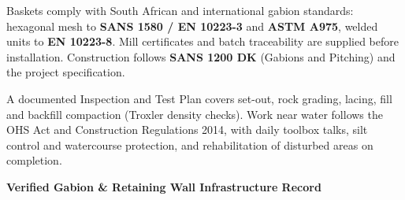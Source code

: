 \documentclass[a4paper,11pt]{article}
\providecommand{\faShieldAlt}{\faShield*}
\begin{document}
\vfill

\noindent
\begin{minipage}[t]{0.485\textwidth}
    \begin{tcolorbox}[
        enhanced, colback=white, colframe=mhlightgray, boxrule=0.8pt, arc=4pt,
        title={\bfseries\color{white}\faShieldAlt\ Materials \& Standards},
        colbacktitle=mhnavy, fonttitle=\bfseries\small,
        left=8pt, right=8pt, top=6pt, bottom=6pt, height=2.8cm,
        drop shadow=black!4
    ]
        {\fontsize{8.0pt}{11.2pt}\selectfont\color{mhtext}
        Baskets comply with South African and international gabion standards: hexagonal mesh to \textbf{SANS 1580 / EN 10223-3} and \textbf{ASTM A975}, welded units to \textbf{EN 10223-8}. Mill certificates and batch traceability are supplied before installation. Construction follows \textbf{SANS 1200 DK} (Gabions and Pitching) and the project specification.
        }
    \end{tcolorbox}
\end{minipage}
\hfill
\begin{minipage}[t]{0.485\textwidth}
    \begin{tcolorbox}[
        enhanced, colback=white, colframe=mhlightgray, boxrule=0.8pt, arc=4pt,
        title={\bfseries\color{white}\faCheckDouble\ Quality, Safety \& Environment},
        colbacktitle=mhblue, fonttitle=\bfseries\small,
        left=8pt, right=8pt, top=6pt, bottom=6pt, height=2.8cm,
        drop shadow=black!4
    ]
        {\fontsize{8.0pt}{11.2pt}\selectfont\color{mhtext}
        A documented Inspection and Test Plan covers set-out, rock grading, lacing, fill and backfill compaction (Troxler density checks). Work near water follows the OHS Act and Construction Regulations 2014, with daily toolbox talks, silt control and watercourse protection, and rehabilitation of disturbed areas on completion.
        }
    \end{tcolorbox}
\end{minipage}

\vfill

\noindent
{\large\bfseries\color{mhnavy} Verified Gabion \& Retaining Wall Infrastructure Record}
\vspace{0.12cm}
\end{document}
